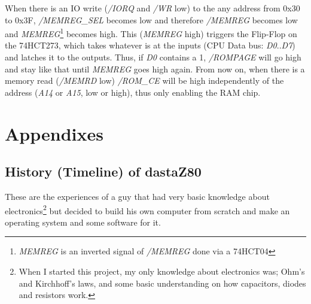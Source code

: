 \documentclass[a4paper,11pt]{article}
\begin{document}
    When there is an IO write (\textit{/IORQ} and \textit{/WR} low) to the any
    address from 0x30 to 0x3F, \textit{/MEMREG\_SEL} becomes low and therefore 
    \textit{/MEMREG} becomes low and \textit{MEMREG}\footnote{\textit{MEMREG} is
    an inverted signal of \textit{/MEMREG} done via a 74HCT04} becomes high. This
    (\textit{MEMREG} high) triggers the Flip-Flop on the 74HCT273, which takes
    whatever is at the inputs (CPU Data bus: \textit{D0}..\textit{D7}) and
    latches it to the outputs. Thus, if \textit{D0} contains a 1,
    \textit{/ROMPAGE} will go high and stay like that until \textit{MEMREG} goes
    high again. From now on, when there is a memory read (\textit{/MEMRD} low)
    \textit{/ROM\_CE} will be high independently of the address (\textit{A14}
    or \textit{A15}, low or high), thus only enabling the RAM chip.

    \pagebreak
    \section{Appendixes}
    \label{sec:appendixes}

    \subsection{History (Timeline) of dastaZ80}

    These are the experiences of a guy that had very basic knowledge about
    electronics\footnote{When I started this project, my only knowledge about
    electronics was; Ohm's and Kirchhoff's laws, and some basic understanding
    on how capacitors, diodes and resistors work.} but decided to build his own
    computer from scratch and make an operating system and some software for it.
\end{document}

